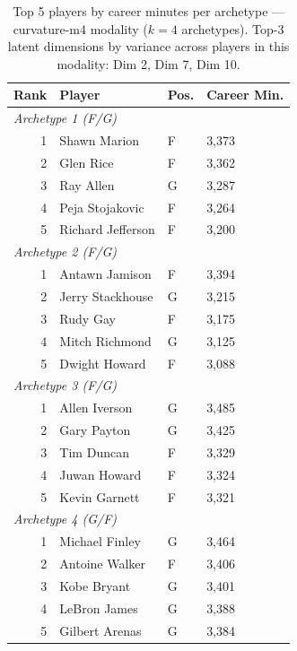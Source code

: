 \begin{table}[htbp]
  \centering\small
  \begin{tabular}{rlll}
    \toprule
    Rank & Player & Pos. & Career Min. \\
    \midrule
    \multicolumn{4}{l}{\textit{Archetype 1 (F/G)}} \\
    \midrule
    1 & Shawn Marion & F & 3,373 \\
    2 & Glen Rice & F & 3,362 \\
    3 & Ray Allen & G & 3,287 \\
    4 & Peja Stojakovic & F & 3,264 \\
    5 & Richard Jefferson & F & 3,200 \\
    \midrule[0.4pt]
    \multicolumn{4}{l}{\textit{Archetype 2 (F/G)}} \\
    \midrule
    1 & Antawn Jamison & F & 3,394 \\
    2 & Jerry Stackhouse & G & 3,215 \\
    3 & Rudy Gay & F & 3,175 \\
    4 & Mitch Richmond & G & 3,125 \\
    5 & Dwight Howard & F & 3,088 \\
    \midrule[0.4pt]
    \multicolumn{4}{l}{\textit{Archetype 3 (F/G)}} \\
    \midrule
    1 & Allen Iverson & G & 3,485 \\
    2 & Gary Payton & G & 3,425 \\
    3 & Tim Duncan & F & 3,329 \\
    4 & Juwan Howard & F & 3,324 \\
    5 & Kevin Garnett & F & 3,321 \\
    \midrule[0.4pt]
    \multicolumn{4}{l}{\textit{Archetype 4 (G/F)}} \\
    \midrule
    1 & Michael Finley & G & 3,464 \\
    2 & Antoine Walker & F & 3,406 \\
    3 & Kobe Bryant & G & 3,401 \\
    4 & LeBron James & G & 3,388 \\
    5 & Gilbert Arenas & G & 3,384 \\
    \bottomrule
  \end{tabular}
  \caption{Top 5 players by career minutes per archetype --- curvature-m4 modality ($k=4$ archetypes). Top-3 latent dimensions by variance across players in this modality: Dim 2, Dim 7, Dim 10.}
  \label{tab:arch_reps_curvature_m4}
\end{table}

